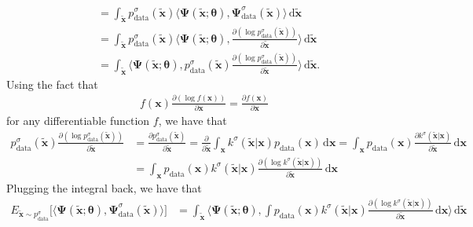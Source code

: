 \documentclass[10pt]{article}
\newcommand{\dee}{\mathrm{d}}
\newcommand{\ve}[1]{\mathbf{#1}}
\newcommand{\mrm}[1]{\mathrm{#1}}
\newcommand{\ves}[1]{\boldsymbol{#1}}
\begin{document}
\begin{itemize}
\begin{align*}
    &= \int_{\widetilde{\ve{x}}} p^\sigma_{\mrm{data}}(\widetilde{\ve{x}}) \big\langle \ves{\Psi}(\widetilde{\ve{x}};\ves{\theta}), \ves{\Psi}^\sigma_{\mrm{data}}(\widetilde{\ve{x}}) \big\rangle\, \dee\widetilde{\ve{x}} \\
    &= \int_{\widetilde{\ve{x}}} p^\sigma_{\mrm{data}}(\widetilde{\ve{x}}) \bigg\langle \ves{\Psi}(\widetilde{\ve{x}};\ves{\theta}), \frac{\partial(\log p^\sigma_{\mrm{data}}(\widetilde{\ve{x}})) }{\partial 
    \widetilde{\ve{x}}} \bigg\rangle\, \dee\widetilde{\ve{x}} \\
    &= \int_{\widetilde{\ve{x}}} \bigg\langle \ves{\Psi}(\widetilde{\ve{x}};\ves{\theta}), p^\sigma_{\mrm{data}}(\widetilde{\ve{x}}) \frac{\partial (\log p^\sigma_{\mrm{data}}(\widetilde{\ve{x}})) }{\partial \widetilde{\ve{x}}} \bigg\rangle\, \dee\widetilde{\ve{x}}.
  \end{align*}
  Using the fact that
  \begin{align*}
    f(\ve{x}) \frac{\partial(\log f(\ve{x}))}{\partial \ve{x}} = \frac{\partial f(\ve{x})}{\partial \ve{x}}
  \end{align*}
  for any differentiable function $f$, we have that
  \begin{align*}
    p^\sigma_{\mrm{data}}(\widetilde{\ve{x}}) \frac{\partial (\log p^\sigma_{\mrm{data}}(\widetilde{\ve{x}})) }{\partial \widetilde{\ve{x}}} 
    &= \frac{\partial p^\sigma_{\mrm{data}}(\widetilde{\ve{x}}) }{\partial \widetilde{\ve{x}}} 
    = \frac{\partial }{\partial 
    \widetilde{\ve{x}}} \int_{\ve{x}} k^\sigma(\widetilde{\ve{x}}|\ve{x}) p_{\mrm{data}}(\ve{x}) \,\dee\ve{x}
    = \int_{\ve{x}} p_{\mrm{data}}(\ve{x}) \frac{\partial k^\sigma(\widetilde{\ve{x}}|\ve{x}) }{\partial \widetilde{\ve{x}}} \,\dee\ve{x} \\
    &= \int_{\ve{x}} p_{\mrm{data}}(\ve{x}) k^\sigma(\widetilde{\ve{x}}|\ve{x}) \frac{\partial (\log k^\sigma(\widetilde{\ve{x}}|\ve{x})) }{\partial \widetilde{\ve{x}}} \,\dee\ve{x}
  \end{align*}
  Plugging the integral back, we have that
  \begin{align*}
    E_{\widetilde{\ve{x}} \sim p^\sigma_{\mrm{data}}}\Big[ \big\langle \ves{\Psi}(\widetilde{\ve{x}};\ves{\theta}), \ves{\Psi}^\sigma_{\mrm{data}}(\widetilde{\ve{x}}) \big\rangle \Big]    
    &= \int_{\widetilde{\ve{x}}} \bigg\langle \ves{\Psi}(\widetilde{\ve{x}};\ves{\theta}), \int p_{\mrm{data}}(\ve{x}) k^\sigma(\widetilde{\ve{x}}|\ve{x}) \frac{\partial (\log k^\sigma(\widetilde{\ve{x}}|\ve{x})) }{\partial \widetilde{\ve{x}}} \,\dee\ve{x} \bigg\rangle\, \dee\widetilde{\ve{x}} \\

\end{align*}
\end{itemize}
\end{document}
